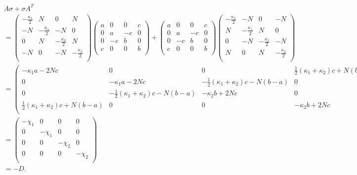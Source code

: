 \documentclass[11pt,a4paper]{article}
\numberwithin{equation}{section}
\begin{document}
	\begin{align*}
	&A\sigma +\sigma A^{T}&\\
	&= \begin{pmatrix}
	-\frac{\kappa_1}{2} & N & 0 & N\\
	-N & -\frac{\kappa_1}{2} & -N & 0 \\
	0 & N & -\frac{\kappa_2}{2} & N\\
	-N & 0 & -N & -\frac{\kappa_2}{2}\\
	\end{pmatrix}\begin{pmatrix}
	a & 0 & 0 & c\\
	0 & a & -c & 0\\
	0 & -c & b & 0 \\
	c & 0 & 0 & b\\
	\end{pmatrix} + \begin{pmatrix}
	a & 0 & 0 & c\\
	0 & a & -c & 0\\
	0 & -c & b & 0 \\
	c & 0 & 0 & b\\
	\end{pmatrix}\begin{pmatrix}
	-\frac{\kappa_1}{2} & -N & 0 & -N\\
	N & -\frac{\kappa_1}{2} & N & 0 \\
	0 & -N & -\frac{\kappa_2}{2} & -N\\
	N & 0 & N & -\frac{\kappa_2}{2}\\
	\end{pmatrix}&\\
	&= \begin{pmatrix}
	-\kappa_1 a - 2Nc & 0 & 0 & \frac{1}{2}(\kappa_1 + \kappa_2)c + N(b-a)\\
	0 & -\kappa_1 a - 2Nc & -\frac{1}{2}(\kappa_1 + \kappa_2)c - N(b-a) & 0 \\
	0 & -\frac{1}{2}(\kappa_1 + \kappa_2)c - N(b-a) & -\kappa_2 b + 2Nc & 0\\
	\frac{1}{2}(\kappa_1 + \kappa_2)c + N(b-a) & 0 & 0 & -\kappa_2 b + 2Nc\\
	\end{pmatrix}&\\
	&= \begin{pmatrix}
	-\chi_1 & 0 & 0 & 0\\
	0 & -\chi_1 & 0 & 0 \\
	0 & 0 & -\chi_2 & 0\\
	0 & 0 & 0 & -\chi_2\\
	\end{pmatrix}&\\
	&= -D.&
	\end{align*}
	
\end{document}
